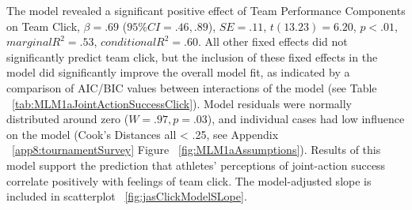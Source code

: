 \begin{CJK}{UTF8}{gbsn}
The model revealed a significant positive effect of Team Performance Components on Team Click, $\beta = .69$ ($95\% CI =  .46, .89$), $SE = .11$, $t(13.23) = 6.20$, $p < .01$, $marginal R^2 = .53$, $conditional R^2 = .60$. All other fixed effects did not significantly predict team click, but the inclusion of these fixed effects in the model did significantly improve the overall model fit, as indicated by a comparison of AIC/BIC values between interactions of the model (see Table ~\ref{tab:MLM1aJointActionSuccessClick}).  Model residuals were normally distributed around zero ($W = .97, p = .03$), and individual cases had low influence on the model (Cook's Distances all < .25, see Appendix ~\ref{app8:tournamentSurvey} Figure ~\ref{fig:MLM1aAssumptions}). Results of this model support the prediction that athletes' perceptions of joint-action success correlate positively with feelings of team click.  The model-adjusted slope is included in scatterplot ~\ref{fig:jasClickModelSLope}.






\end{CJK}
